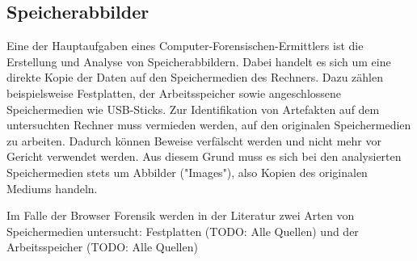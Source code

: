 \subsection*{Speicherabbilder}
Eine der Hauptaufgaben eines Computer-Forensischen-Ermittlers ist die Erstellung und Analyse von Speicherabbildern. \cite{Hassan.2019}
Dabei handelt es sich um eine direkte Kopie der Daten auf den Speichermedien des Rechners. \cite{Hassan.2019}
Dazu zählen beispielsweise Festplatten, der Arbeitsspeicher sowie angeschlossene Speichermedien wie USB-Sticks.
Zur Identifikation von Artefakten auf dem untersuchten Rechner muss vermieden werden, auf den originalen Speichermedien zu arbeiten.
Dadurch können Beweise verfälscht werden und nicht mehr vor Gericht verwendet werden. \cite{Hassan.2019}
Aus diesem Grund muss es sich bei den analysierten Speichermedien stets um Abbilder ("Images"), also Kopien des originalen Mediums handeln.

Im Falle der Browser Forensik werden in der Literatur zwei Arten von Speichermedien untersucht: Festplatten (TODO: Alle Quellen) und der Arbeitsspeicher (TODO: Alle Quellen)

